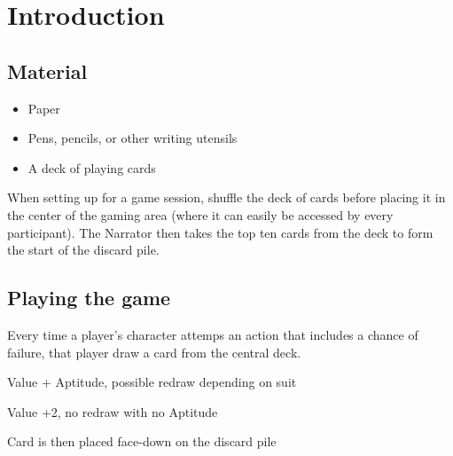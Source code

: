 \chapter{Introduction}

\section{Material}
\begin{itemize}
\item Paper
\item Pens, pencils, or other writing utensils
\item A deck of playing cards
\end{itemize}

When setting up for a game session, shuffle the deck of cards before placing it in the center of the gaming area
(where it can easily be accessed by every participant). The Narrator then takes the top ten cards from the deck
to form the start of the discard pile.

\section{Playing the game}

Every time a player's character attemps an action that includes a chance of failure, that player draw a card
from the central deck.

Value + Aptitude, possible redraw depending on suit

Value +2, no redraw with no Aptitude

Card is then placed face-down on the discard pile
